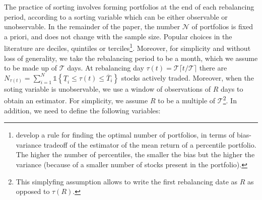The practice of sorting involves forming portfolios at the end of each rebalancing period, according to a sorting variable which can be either observable or unobservable. In the remainder of the paper, the number $\mathcal{N}$ of portfolios is fixed a priori, and does not change with the sample size. Popular choices in the literature are deciles, quintiles or terciles\footnote{\cite{cattaneo2020characteristic} develop a rule for finding the optimal number of portfolios, in terms of bias-variance tradeoff of the estimator of the mean return of a percentile portfolio. The higher the number of percentiles, the smaller the bias but the higher the variance (because of a smaller number of stocks present in the portfolio).}. Moreover, for simplicity and without loss of generality, we take the rebalancing period to be a month, which we assume to be made up of $\mathcal{T}$ days. At rebalancing day $\tau(t) = \mathcal{T} \lceil t/\mathcal{T} \rceil$ there are $N_{\tau(t)}=\sum_{i=1}^{N} \mathds{1} \left\{ \underline{T}_{i} \leq \tau(t) \leq \overline{T}_{i} \right\}$ stocks actively traded. Moreover, when the soting variable is unobservable, we use a window of observations of $R$ days to obtain an estimator. For simplicity, we assume $R$ to be a multiple of $\mathcal{T}$\footnote{This simplyfing assumption allows to write the first rebalancing date as $R$ as opposed to $\tau(R)$.}. In addition, we need to define the following variables:

